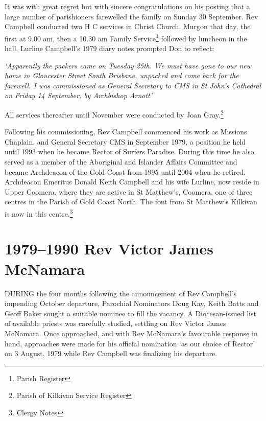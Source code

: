 It was with great regret but with sincere congratulations on his posting that a large number of parishioners farewelled the family on Sunday 30 September. Rev Campbell conducted two H C services in Christ Church, Murgon that day, the first at 9.00 am, then a 10.30 am Family Service\footnote{Parish Register} followed by luncheon in the hall. Lurline Campbell's 1979 diary notes prompted Don to reflect:


\emph{`Apparently the packers came on Tuesday 25th. We must have gone to our new home in Gloucester Street South Brisbane, unpacked and come back for the farewell. I was commissioned as General Secretary to CMS in St John's Cathedral on Friday 14 September, by Archbishop Arnott'}



All services thereafter until November were conducted by Joan Gray.\footnote{Parish of Kilkivan Service Register}


Following his commissioning, Rev Campbell commenced his work as Missions Chaplain, and General Secretary CMS in September 1979, a position he held until 1993 when he became Rector of Surfers Paradise. During this time he also served as a member of the Aboriginal and Islander Affairs Committee and became Archdeacon of the Gold Coast from 1995 until 2004 when he retired. Archdeacon Emeritus Donald Keith Campbell and his wife Lurline, now reside in Upper Coomera, where they are active in St Matthew's, Coomera, one of three centres in the Parish of Gold Coast North. The font from St Matthew's Kilkivan is now in this centre.\footnote{Clergy Notes}


\balance


\printendnotes[custom]
\setcounter{endnote}{0}
\chapter{1979--1990 Rev Victor James McNamara}
\nobalance


\lettrine[lines=3]{D}{URING}
 the four months following the announcement of Rev Campbell's impending October departure, Parochial Nominators Doug Kay, Keith Batts and Geoff Baker sought a suitable nominee to fill the vacancy. A Diocesan-issued list of available priests was carefully studied, settling on Rev Victor James McNamara. Once approached, and with Rev McNamara's favourable response in hand, approaches were made for his official nomination `as our choice of Rector' on 3 August, 1979 while Rev Campbell was finalizing his departure.







